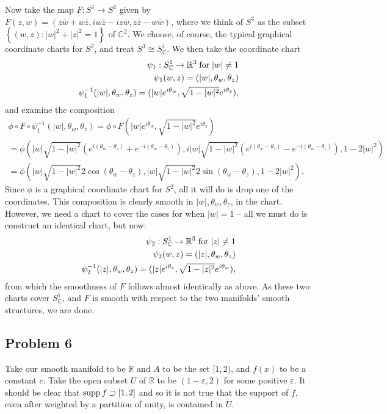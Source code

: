\documentclass{../../mathnotes}
\begin{document}
Now take the map $F:S^3\to S^2$ given by $F(z,w)=(z\bar{w}+w\bar{z},iw\bar{z}-iz\bar{w},z\bar{z}-w\bar{w})$, where we think of $S^3$ as the subset
$\left\{ (w,z):|w|^2+|z|^2=1 \right\}$ of $\mathbb{C}^2$. We choose, of course, the typical graphical coordinate charts for $S^2$, and treat 
$S^3\cong S^1_{\mathbb{C}}$. We then take the coordinate chart
\begin{align*}
    \psi_1:S^1_{\mathbb{C}}\to \mathbb{R}^3\;\textnormal{for}\;|w|\neq 1\\
    \psi_1(w,z)=(|w|,\theta_w,\theta_z)\\
    \psi_1^{-1}(|w|,\theta_w,\theta_z)=(|w|e^{i\theta_w},\sqrt{1-|w|^2}e^{i\theta_z}),
\end{align*}
and examine the composition
\begin{align*}
    \phi\circ F\circ \psi_1^{-1}(|w|,\theta_w,\theta_z)=\phi\circ F\left(|w|e^{i\theta_w},\sqrt{1-|w|^2}e^{i\theta_z}\right)\\
    =\phi\left( |w|\sqrt{1-|w|^2}(e^{i(\theta_w-\theta_z)}+e^{-i(\theta_w-\theta_z)}),i|w|\sqrt{1-|w|^2}(e^{i(\theta_w-\theta_z)}-e^{-i(\theta_w-\theta_z)}),1-2|w|^2 \right)\\
    =\phi\left(|w|\sqrt{1-|w|^2}2\cos(\theta_w-\theta_z),|w|\sqrt{1-|w|^2}2\sin(\theta_w-\theta_z),1-2|w|^2\right).
\end{align*}
Since $\phi$ is a graphical coordinate chart for $S^2$, all it will do is drop one of the coordinates. This composition is clearly smooth in $|w|,\theta_w, \theta_z$,
in the chart. However, we need a chart to cover the cases for when $|w|=1$ -- all we must do is construct an identical chart, but now:
\begin{align*}
    \psi_2:S^1_{\mathbb{C}}\to \mathbb{R}^3\;\textnormal{for}\;|z|\neq 1\\
    \psi_2(w,z)=(|z|,\theta_w,\theta_z)\\
    \psi_2^{-1}(|z|,\theta_w,\theta_z)=(|z|e^{i\theta_z},\sqrt{1-|z|^2}e^{i\theta_w}),
\end{align*}
from which the smoothness of $F$ follows almost identically as above. As these two charts cover $S^1_{\mathbb{C}}$, and
$F$ is smooth with respect to the two manifolds' smooth structures, we are done.

\subsection*{Problem 6}

Take our smooth manifold to be $\mathbb{R}$ and $A$ to be the set $[1,2)$, and $f(x)$ to be a constant $c$. Take the open subset $U$ of $\mathbb{R}$
    to be $(1-\varepsilon,2)$ for some positive $\varepsilon$. It should be clear that $\operatorname{supp} f\supset [1,2]$ and so it is not true that the support
    of $f$, even after weighted by a partition of unity, is contained in $U$.
\end{document}
